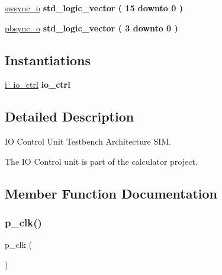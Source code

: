 \begin{DoxyCompactItemize}
\item 
\hyperlink{classtb__io__ctrl_1_1sim_a520bda20a1a041dd2480ab8773097342}{swsync\+\_\+o} {\bfseries \textcolor{comment}{std\+\_\+logic\+\_\+vector}\textcolor{vhdlchar}{ }\textcolor{vhdlchar}{(}\textcolor{vhdlchar}{ }\textcolor{vhdlchar}{ } \textcolor{vhdldigit}{15} \textcolor{vhdlchar}{ }\textcolor{keywordflow}{downto}\textcolor{vhdlchar}{ }\textcolor{vhdlchar}{ } \textcolor{vhdldigit}{0} \textcolor{vhdlchar}{ }\textcolor{vhdlchar}{)}\textcolor{vhdlchar}{ }} 
\item 
\hyperlink{classtb__io__ctrl_1_1sim_a47817054e5c040044217f0d8d20adc72}{pbsync\+\_\+o} {\bfseries \textcolor{comment}{std\+\_\+logic\+\_\+vector}\textcolor{vhdlchar}{ }\textcolor{vhdlchar}{(}\textcolor{vhdlchar}{ }\textcolor{vhdlchar}{ } \textcolor{vhdldigit}{3} \textcolor{vhdlchar}{ }\textcolor{keywordflow}{downto}\textcolor{vhdlchar}{ }\textcolor{vhdlchar}{ } \textcolor{vhdldigit}{0} \textcolor{vhdlchar}{ }\textcolor{vhdlchar}{)}\textcolor{vhdlchar}{ }} 
\end{DoxyCompactItemize}
\subsection*{Instantiations}
 \begin{DoxyCompactItemize}
\item 
\hyperlink{classtb__io__ctrl_1_1sim_a27c0b00ffb215dedd3c56546e08ebc31}{i\+\_\+io\+\_\+ctrl}  {\bfseries io\+\_\+ctrl}   
\end{DoxyCompactItemize}


\subsection{Detailed Description}
IO Control Unit Testbench Architecture S\+IM. 

The IO Control unit is part of the calculator project. 

\subsection{Member Function Documentation}
\mbox{\label{classtb__io__ctrl_1_1sim_af35c81fcf5e4601a4e5d669b422cf79a}} 
\subsubsection{\texorpdfstring{p\+\_\+clk()}{p\_clk()}}
{\footnotesize\ttfamily p\+\_\+clk (\begin{DoxyParamCaption}{ }\end{DoxyParamCaption})}



